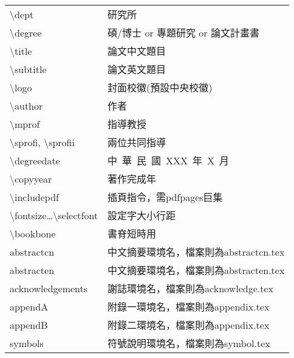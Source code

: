 \begin{symbols}
\begin{tabular}{l@{ : }l}
\textbackslash dept & {研究所}           \\[1ex]                         
\textbackslash degree & {碩/博士 or 專題研究 or 論文計畫書}     \\[1ex]                                      
\textbackslash title & {論文中文題目}  \\[1ex]
\textbackslash subtitle & {論文英文題目}  \\[1ex] 
\textbackslash logo & 封面校徽(預設中央校徽)\\[1ex]
\textbackslash author& 作者             \\[1ex]                                   
\textbackslash mprof&  指導教授          \\[1ex]                  
\textbackslash sprofi, \textbackslash sprofii& 兩位共同指導 \\[1ex]
\textbackslash degreedate& 中~華~民~國~XXX~年~X~月 \\[1ex]
\textbackslash copyyear& 著作完成年  \\[1ex]
\textbackslash includepdf & 插頁指令，需pdfpages巨集 \\[1ex]
\textbackslash fontsize\ldots\textbackslash selectfont & 設定字大小行距\\[1ex]
\textbackslash bookbone & 書脊短時用\\[1ex]
abstractcn & 中文摘要環境名，檔案則為abstractcn.tex\\[1ex]
abstracten &  中文摘要環境名，檔案則為abstracten.tex\\[1ex]
acknowledge{\color{red}ments} &  謝誌環境名，檔案則為acknowledge.tex\\[1ex]
append{\color {red}A} &  附錄一環境名，檔案則為appendix.tex\\[1ex]
append{\color {red}B} &  附錄二環境名，檔案則為appendix.tex\\[1ex]
symbol{\color {red}s} &  符號說明環境名，檔案則為symbol.tex\\[1ex]
\end{tabular}
\label{symb}
\end{symbols}